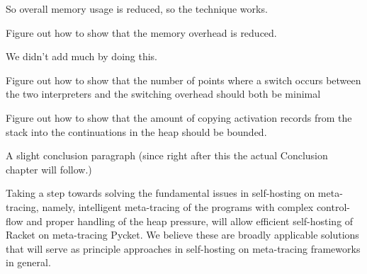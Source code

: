      \begin{paragraph-here}
        So overall memory usage is reduced, so the technique works.
      \end{paragraph-here}

      \begin{todo}
        Figure out how to show that the memory overhead is reduced.
      \end{todo}

      \begin{paragraph-here}
        We didn't add much by doing this.
      \end{paragraph-here}

      \begin{todo}
        Figure out how to show that the number of points where a switch occurs between the two interpreters and the switching overhead should both be minimal
      \end{todo}

      \begin{todo}
        Figure out how to show that the amount of copying activation records from the stack into the continuations in the heap should be bounded.
      \end{todo}


      \begin{paragraph-here}
        A slight conclusion paragraph (since right after this the actual Conclusion chapter will follow.)

          Taking a step towards solving the fundamental issues in self-hosting
        on meta-tracing, namely, intelligent meta-tracing of the programs with
        complex control-flow and proper handling of the heap pressure, will
        allow efficient self-hosting of Racket on meta-tracing Pycket. We
        believe these are broadly applicable solutions that will serve as
        principle approaches in self-hosting on meta-tracing frameworks in
        general.
      \end{paragraph-here}


